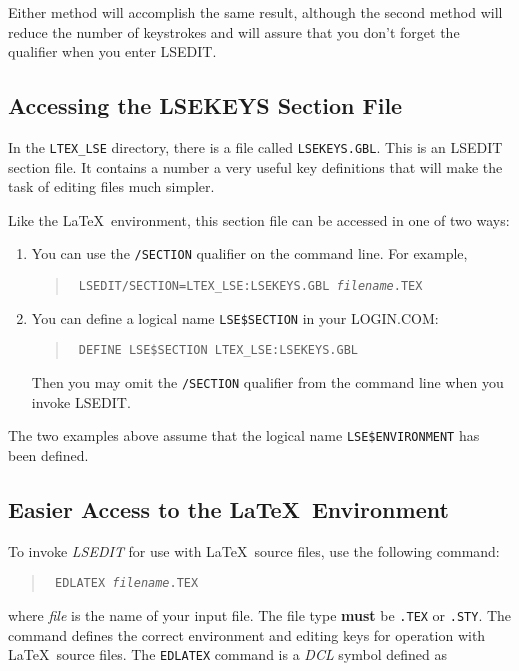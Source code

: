 Either method will accomplish the same result, although the second method will
reduce the number of keystrokes and will assure that you don't forget the
qualifier when you enter LSEDIT.

\subsection{Accessing the LSEKEYS Section File}

In the \verb|LTEX_LSE| directory, there is a file called \verb|LSEKEYS.GBL|.
This is an LSEDIT section file. It contains a number a very useful key
definitions that will make the task of editing files much simpler.

Like the \LaTeX\ environment, this section file can be accessed in one of two
ways:
\begin{enumerate}
\item You can use the {\tt /SECTION} qualifier on the command line. For
example,
\begin{quote}
\tt
\prompt{} LSEDIT/SECTION=LTEX\_LSE:LSEKEYS.GBL {\it filename\/}.TEX \hfil
\end{quote}

\item You can define a logical name {\tt LSE\$SECTION} in your LOGIN.COM:
\begin{quote}
\tt
\prompt{} DEFINE LSE\$SECTION LTEX\_LSE:LSEKEYS.GBL \hfil
\end{quote}
Then you may omit the {\tt /SECTION} qualifier from the command line when
you invoke LSEDIT.
\end{enumerate}

The two examples above assume that the logical name \verb|LSE$ENVIRONMENT| has
been defined.

\subsection{Easier Access to the \LaTeX\ Environment}

To invoke {\sl LSEDIT\/} for use with \LaTeX\ source files, use the
following command:
\begin{quote}
\tt
\prompt{} EDLATEX {\it filename\/}.TEX \hfill
\end{quote}

where {\it file\/} is the name of your input file.  The file type {\bf must} be
{\tt .TEX} or {\tt .STY}. The command defines the correct environment and
editing keys for operation with \LaTeX\ source files.
The {\tt EDLATEX} command is a {\sl DCL\/} symbol defined as

